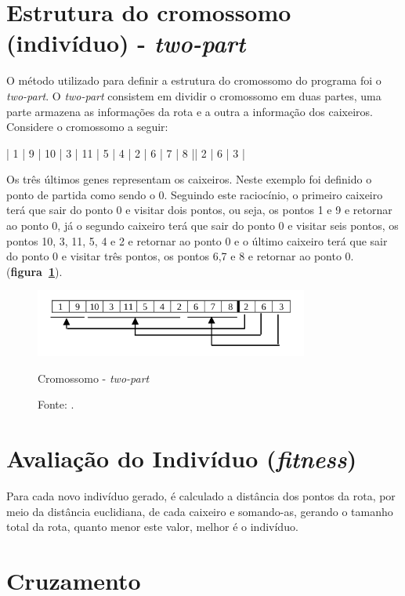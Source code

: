 \documentclass{abnt}
\begin{document}
		
		\section{Estrutura do cromossomo (indivíduo) - \textit{two-part}}
		
			O método utilizado para definir a estrutura do cromossomo do programa foi o \textit{two-part}.
			O \textit{two-part} consistem em dividir o cromossomo em duas partes, uma parte armazena as informações da rota e a outra a informação dos caixeiros. Considere o cromossomo a seguir:

			\begin{center}
				| 1 | 9 | 10 | 3 | 11 | 5 | 4 | 2 | 6 | 7 | 8 || 2 | 6  | 3 |
			\end{center}

			Os três últimos genes representam os caixeiros. Neste exemplo foi definido o ponto de partida como sendo o 0. Seguindo este raciocínio, o primeiro caixeiro terá que sair do ponto 0 e visitar dois pontos, ou seja, os pontos 1 e 9 e retornar ao ponto 0, já o segundo caixeiro terá que sair do ponto 0 e visitar seis pontos, os pontos 10, 3, 11, 5, 4 e 2 e retornar ao ponto 0 e o último caixeiro terá que sair do ponto 0 e visitar três pontos, os pontos 6,7 e 8 e retornar ao ponto 0. (\textbf{figura~\ref{two-part}}).

			\begin{figure}[h]
				\centering
		        \includegraphics[width = 9cm,keepaspectratio]{img/two-part.png}
		        \caption{Cromossomo - \textit{two-part}}
		        \caption*{Fonte: \cite{0011-pdf}.}
		        \label{two-part}
	   		\end{figure}
	   	
	   	\section{Avaliação do Indivíduo (\textit{fitness})}

		Para cada novo indivíduo gerado, é calculado a distância dos pontos da rota, por meio da distância euclidiana,  de cada caixeiro e somando-as, gerando o tamanho total da rota, quanto menor este valor, melhor é o indivíduo.
				

		\section{Cruzamento}
\end{document}
